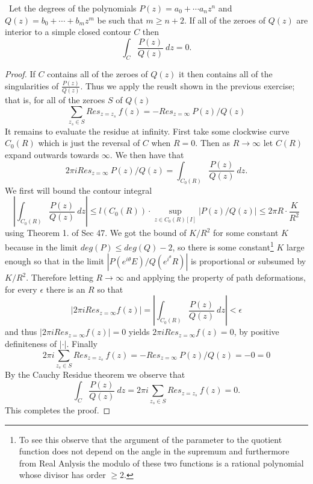 \documentclass[11pt]{amsart}
\theoremstyle{definition}
\numberwithin{theorem}{section}
\numberwithin{definition}{section}
\numberwithin{equation}{section}
\begin{document}
\medskip {}\ Let the degrees of the polynomials $P(z) = a_0 + \cdots a_nz^n$
and $Q(z) = b_0 + \cdots + b_m z^m$ be such that $m \geq n+2$. If all of the zeroes of $Q(z)$ are interior to a simple closed contour $C$ then
\begin{equation*}
	\int_C \frac{P(z)}{Q(z)}\ dz = 0.
\end{equation*}
\begin{proof}
	If $C$ contains all of the zeroes of $Q(z)$ it then contains all of the singularities of $\frac{P(z)}{Q(z)}.$ Thus we apply the reuslt shown in the previous exercise; that is, for all of the zeroes $S$ of $Q(z)$
	\begin{equation*}
		\sum_{z_s \in S} Res_{z= z_s}\ f(z) = - Res_{z=\infty}\ P(z)/Q(z)
	\end{equation*}
	It remains to evaluate the residue at infinity. First take some clockwise curve $C_0(R)$ which is just the reversal of $C$ when $R= 0$. Then as $R \to \infty$ let $C(R)$ expand outwards towards $\infty$. We then have that
	\begin{equation*}
		2\pi i Res_{z=\infty}\ P(z)/Q(z) = \int_{C_0(R)} \frac{P(z)}{Q(z)}\ dz.
	\end{equation*}
	We first will bound the contour integral
	\begin{equation*}
		\left |\int_{C_0(R)} \frac{P(z)}{Q(z)}\ dz\right| \leq l(C_0(R))\cdot \sup_{z \in C_0(R)[I]} |P(z)/Q(z)| \leq 2\pi R \cdot \frac{K}{R^2}
	\end{equation*}
	using Theorem 1. of Sec 47. We got the bound of $K/R^2$ for some constant $K$ because in the limit $deg(P) \leq deg(Q) - 2$, so there is some constant\footnote{To see this observe that the argument of the parameter to the quotient function does not depend on the angle in the supremum and furthermore from Real Anlysis the modulo of these two functions is a rational polynomial whose divisor has order $\geq 2$.} $K$ large enough so that in the limit $|P(e^{i\theta}E)/Q(e^{i^\theta}R)|$ is proportional or subsumed by $K/R^2$. Therefore letting $R\to \infty$ and applying the property of path deformations, for every $\epsilon$ there is an $R$ so that
	\begin{equation*}
	|2\pi i Res_{z=\infty } f(z)| = \left |\int_{C_0(R)} \frac{P(z)}{Q(z)}\ dz\right| < \epsilon
	\end{equation*}
	and thus $|2\pi i Res_{z=\infty } f(z)| = 0$ yields $2\pi i Res_{z=\infty } f(z) = 0$, by positive definiteness of $|\cdot |.$ Finally
	\begin{equation*}
	2\pi i \sum_{z_s \in S} Res_{z= z_s}\ f(z) = - Res_{z=\infty}\ P(z)/Q(z) = -0 = 0
	\end{equation*}
	By the Cauchy Residue theorem we observe that
	\begin{equation*}
		\int_C \frac{P(z)}{Q(z)} \ dz= 2\pi i \sum_{z_s \in S} Res_{z= z_s}\ f(z) = 0.
	\end{equation*}
	This completes the proof.

\end{proof}
\end{document}
